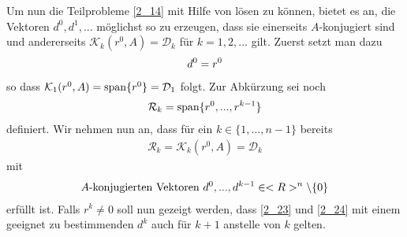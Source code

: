 Um nun die Teilprobleme \cref{2_14} mit Hilfe von  lösen zu können, bietet es an, die Vektoren $d^0,d^1,...$ möglichst so zu erzeugen, dass sie einerseits $A$-konjugiert sind und andererseits $\mathcal{K}_k(r^0,A)=\mathcal{D}_k$ für $k=1,2,...$ gilt. Zuerst setzt man dazu
\begin{align}
	d^0=r^0\notag
\end{align}
so dass $\mathcal{K}_1(r^0,A)=\operatorname{span}\{r^0\}=\mathcal{D}_1$ folgt. Zur Abkürzung sei noch
\begin{align}
	\mathcal{R}_k=\operatorname{span}\{r^0,...,r^{k-1}\}\notag
\end{align}
definiert. Wir nehmen nun an, dass für ein $k\in\{1,...,n-1\}$ bereits
\begin{align}
	\label{2_23}
	\mathcal{R}_k = \mathcal{K}_k(r^0,A)=\mathcal{D}_k
\end{align}
mit
\begin{align}
	\label{2_24}
	A\text{-konjugierten Vektoren } d^0,...,d^{k-1}\in<R>^n\backslash\{0\}
\end{align}
erfüllt ist. Falls $r^k\neq 0$ soll nun gezeigt werden, dass \cref{2_23} und \cref{2_24} mit einem geeignet zu bestimmenden $d^k$ auch für $k+1$ anstelle von $k$ gelten.


